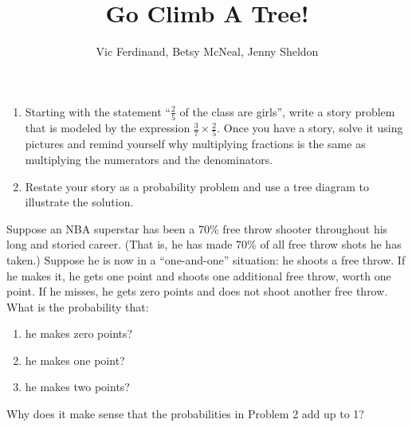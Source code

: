 \documentclass[nooutcomes]{ximera}
\title{Go Climb A Tree!}
\author{Vic Ferdinand, Betsy McNeal, Jenny Sheldon}
\begin{document}
\begin{abstract}
\end{abstract}
\maketitle



\begin{problem}
\begin{enumerate}
\item Starting with the statement ``$\frac25$ of the class are girls'', write a story problem that is modeled by the expression $\frac37 \times \frac25$.  Once you have a story, solve it using pictures and remind yourself why multiplying fractions is the same as multiplying the numerators and the denominators.
\item Restate your story as a probability problem and use a tree diagram to illustrate the solution.
\end{enumerate}
\end{problem}
\vfill
\begin{problem}\label{NBAStar}
Suppose an NBA superstar has been a 70\% free throw shooter throughout his long and storied career.  (That is, he has made 70\% of all free throw shots he has taken.)  Suppose he is now in a ``one-and-one'' situation: he shoots a free throw.  If he makes it, he gets one point and shoots one additional free throw, worth one point.  If he misses, he gets zero points and does not shoot another free throw.  What is the probability that:
\begin{enumerate}
\item he makes zero points?
\item he makes one point?
\item he makes two points?
\end{enumerate}
\end{problem}
\vfill
\begin{problem}
Why does it make sense that the probabilities in Problem 2 add up to 1?
\end{problem}
\vfill
\newpage
\end{document}
